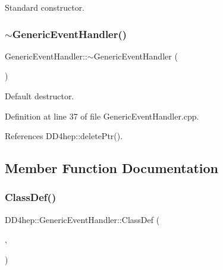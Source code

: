 Standard constructor. 

\hypertarget{class_d_d4hep_1_1_generic_event_handler_a2e5420d14f01ae34c9a0a670a374cf71}{}\label{class_d_d4hep_1_1_generic_event_handler_a2e5420d14f01ae34c9a0a670a374cf71} 
\subsubsection{\texorpdfstring{$\sim$\+Generic\+Event\+Handler()}{~GenericEventHandler()}}
{\footnotesize\ttfamily Generic\+Event\+Handler\+::$\sim$\+Generic\+Event\+Handler (\begin{DoxyParamCaption}{ }\end{DoxyParamCaption})\hspace{0.3cm}{\ttfamily [virtual]}}



Default destructor. 



Definition at line 37 of file Generic\+Event\+Handler.\+cpp.



References D\+D4hep\+::delete\+Ptr().



\subsection{Member Function Documentation}
\hypertarget{class_d_d4hep_1_1_generic_event_handler_abbb82b5fc62720e45ed6c2ff03ae526d}{}\label{class_d_d4hep_1_1_generic_event_handler_abbb82b5fc62720e45ed6c2ff03ae526d} 
\subsubsection{\texorpdfstring{Class\+Def()}{ClassDef()}}
{\footnotesize\ttfamily D\+D4hep\+::\+Generic\+Event\+Handler\+::\+Class\+Def (\begin{DoxyParamCaption}\item[{\hyperlink{class_d_d4hep_1_1_generic_event_handler}{Generic\+Event\+Handler}}]{,  }\item[{0}]{ }\end{DoxyParamCaption})}



